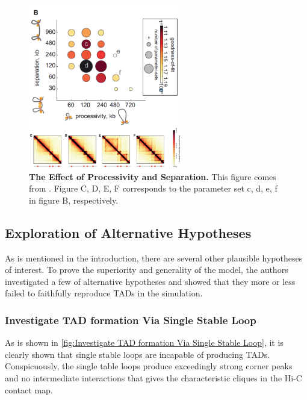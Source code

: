 \documentclass[11pt]{article}
\begin{document}
\begin{figure}[htbp]
  \centering
  \includegraphics[width=0.6\textwidth]{assets/Snipaste_2023-01-13_18-19-27.png}
  \caption{\textbf{The Effect of Processivity and Separation.} This figure comes from \cite{fudenberg_formation_2016}. Figure C, D, E, F corresponds to the parameter set c, d, e, f in figure B, respectively.}
  \label{fig:processivity and separation}
\end{figure}

\subsection{Exploration of Alternative Hypotheses}

As is mentioned in the introduction, there are several other plausible hypotheses of interest. To prove the superiority and generality of the model, the authors investigated a few of alternative hypotheses and showed that they more or less failed to faithfully reproduce TADs in the simulation.

\subsubsection*{Investigate TAD formation Via Single Stable Loop}

As is shown in \cref{fig:Investigate TAD formation Via Single Stable Loop}, it is clearly shown that single stable loops are incapable of producing TADs. Conspicuously, the single table loops produce exceedingly strong corner peaks and no intermediate interactions that gives the characteristic cliques in the Hi-C contact map.
\end{document}
